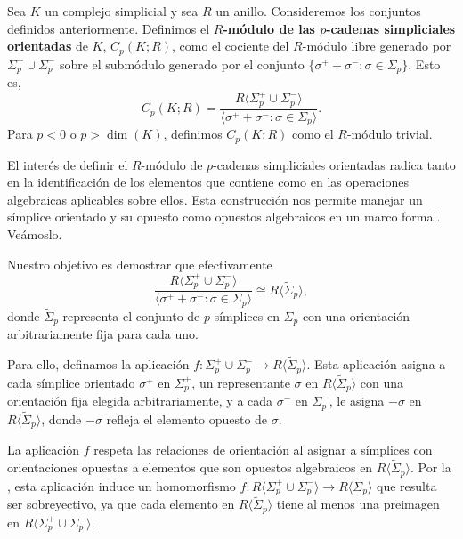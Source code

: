 \begin{definicion}
	Sea \(K\) un complejo simplicial y sea \(R\) un anillo. Consideremos los conjuntos definidos anteriormente. Definimos el \textbf{\(R\)-módulo de las \(p\)-cadenas simpliciales orientadas}
	de \(K\), \(C_{p}(K;R)\), como el cociente del \(R\)-módulo libre generado por
	\(\Sigma_{p}^{+}\cup \Sigma_{p}^{-}\) sobre el submódulo generado por el
	conjunto \(\{\sigma^{+}+ \sigma^{-}: \sigma \in \Sigma_{p}\}\). Esto es,
	\[
	C_{p}(K;R) = \frac{R\langle \Sigma_{p}^{+}\cup \Sigma_{p}^{-}\rangle}{\langle
		\sigma^{+}+ \sigma^{-}: \sigma \in \Sigma_{p}\rangle}.
	\]
	Para \(p < 0\) o \(p > \dim(K)\), definimos \(C_{p}(K;R)\) como el \(R\)-módulo trivial.
\end{definicion}
El interés de definir el \(R\)-módulo de \(p\)-cadenas simpliciales orientadas radica
tanto en la identificación de los elementos que contiene como en las operaciones
algebraicas aplicables sobre ellos. Esta construcción nos permite manejar un
símplice orientado y su opuesto como opuestos algebraicos en un marco formal. Veámoslo.

Nuestro objetivo es demostrar que efectivamente
\[
\frac{R\langle \Sigma_{p}^{+}\cup \Sigma_{p}^{-}\rangle}{\langle \sigma^{+}+
	\sigma^{-}: \sigma \in \Sigma_{p}\rangle}\cong R \langle \tilde{\Sigma}_{p}\rangle
,
\]
donde \(\tilde{\Sigma}_{p}\) representa el conjunto de \(p\)-símplices en \(\Sigma_{p}\)
con una orientación arbitrariamente fija para cada uno.

Para ello, definamos la aplicación
\(f : \Sigma^{+}_{p}\cup \Sigma^{-}_{p}\to R \langle \tilde{\Sigma}_{p}\rangle\). Esta
aplicación asigna a cada símplice orientado \(\sigma^{+}\) en \(\Sigma_{p}^{+}\), un
representante \(\sigma\) en \(R \langle \tilde{\Sigma}_{p}\rangle\) con una
orientación fija elegida arbitrariamente, y a cada \(\sigma^{-}\) en \(\Sigma_{p}^{-}\),
le asigna \(-\sigma\) en \(R \langle \tilde{\Sigma}_{p}\rangle\), donde \(-\sigma\) refleja
el elemento opuesto de \(\sigma\).

La aplicación \(f\) respeta las relaciones de orientación al asignar a símplices con
orientaciones opuestas a elementos que son opuestos algebraicos en \(R \langle \tilde
{\Sigma}_{p}\rangle\). Por la , esta aplicación
induce un homomorfismo
\(\tilde{f}: R\langle \Sigma_{p}^{+}\cup \Sigma_{p}^{-}\rangle \to R \langle \tilde
{\Sigma}_{p}\rangle\)
que resulta ser sobreyectivo, ya que cada elemento en \(R \langle \tilde{\Sigma}_{p}
\rangle\) tiene al menos una preimagen en \(R\langle \Sigma_{p}^{+}\cup \Sigma_{p}^{-}
\rangle\).

